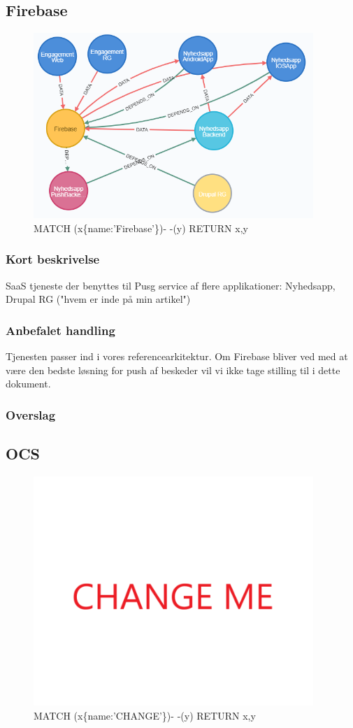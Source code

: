 \documentclass{article}
\begin{document}
\subsection{Firebase}
\begin{figure}[h]
\includegraphics[width=300pt]{Firebase.PNG}
\caption{MATCH (x\{name:'Firebase'\})- -(y) RETURN x,y}
\end{figure}
\subsubsection{Kort beskrivelse}
SaaS tjeneste der benyttes til Pusg service af flere applikationer:
Nyhedsapp, Drupal RG ("hvem er inde på min artikel")
\subsubsection{Anbefalet handling}
Tjenesten passer ind i vores referencearkitektur. Om Firebase bliver ved med at være den bedste løsning for push af beskeder vil vi ikke tage stilling til i dette dokument.
\subsubsection{Overslag}
\subsection{OCS}


\begin{figure}[h]
\includegraphics[width=300pt]{CHANGE.PNG}
\caption{MATCH (x\{name:'CHANGE'\})- -(y) RETURN x,y}
\end{figure}
\end{document}
